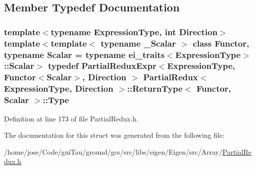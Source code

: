 \subsection{Member Typedef Documentation}
\hypertarget{struct_partial_redux_1_1_return_type_a514615b437d3469f7dff4e21a7d2c863}{
\subsubsection[{Type}]{\setlength{\rightskip}{0pt plus 5cm}template$<$typename Expression\-Type, int Direction$>$ template$<$template$<$ typename \-\_\-\-Scalar $>$ class Functor, typename Scalar = typename ei\-\_\-traits$<$\-Expression\-Type$>$\-::\-Scalar$>$ typedef {\bf Partial\-Redux\-Expr}$<$Expression\-Type, Functor$<${\bf Scalar}$>$, Direction $>$ {\bf Partial\-Redux}$<$ Expression\-Type, Direction $>$\-::{\bf Return\-Type}$<$ Functor, {\bf Scalar} $>$\-::{\bf Type}}}\label{struct_partial_redux_1_1_return_type_a514615b437d3469f7dff4e21a7d2c863}


Definition at line 173 of file Partial\-Redux.\-h.



The documentation for this struct was generated from the following file\-:\begin{DoxyCompactItemize}
\item 
/home/jose/\-Code/gui\-Tau/ground/gcs/src/libs/eigen/\-Eigen/src/\-Array/\hyperlink{_partial_redux_8h}{Partial\-Redux.\-h}\end{DoxyCompactItemize}
